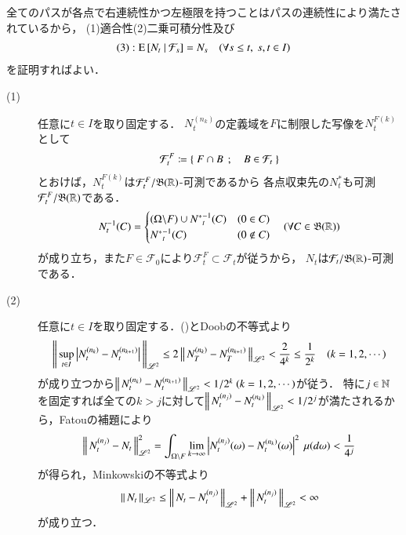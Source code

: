 \begin{prf}
		全てのパスが各点で右連続性かつ左極限を持つことはパスの連続性により満たされているから，
		(1)適合性(2)二乗可積分性及び
		\begin{align}
			\mbox{(3)}:\operatorname{E} \left[ N_t \ \middle|\ \mathcal{F}_s \right] = N_s
			\quad (\forall s \leq t,\ s,t \in I)
		\end{align}
		を証明すればよい．
		\begin{description}
			\item[(1)]
				任意に$t \in I$を取り固定する．
				$N^{(n_k)}_t$の定義域を$F$に制限した写像を$N^{F(k)}_t$として
				\begin{align}
					\mathcal{F}^F_t \coloneqq \left\{\ F \cap B\ \, ; \quad B \in \mathcal{F}_t\ \right\}
				\end{align}
				とおけば，$N^{F(k)}_t$は$\mathcal{F}^F_t/\mathfrak{B}(\mathbb{R})$-可測であるから
				各点収束先の$N^*_t$も可測$\mathcal{F}^F_t/\mathfrak{B}(\mathbb{R})$である．
				\begin{align}
					N^{-1}_t(C) = 
					\begin{cases}
						(\Omega \backslash F) \cup {N^*}^{-1}_t(C) & (0 \in C) \\
						{N^*}^{-1}_t(C) & (0 \notin C)
					\end{cases}
					\quad (\forall C \in \mathfrak{B}(\mathbb{R}))
				\end{align}
				が成り立ち，また$F \in \mathcal{F}_0$により$\mathcal{F}^F_t \subset \mathcal{F}_t$が従うから，
				$N_t$は$\mathcal{F}_t/\mathfrak{B}(\mathbb{R})$-可測である．
			
			\item[(2)]
				任意に$t \in I$を取り固定する．()とDoobの不等式より
				\begin{align}
					\left\|\, \operatorname*{sup}_{t \in I} \left|N^{(n_k)}_t - N^{(n_{k+1})}_t\right|\, \right\|_{\mathscr{L}^2} 
					\leq 2 \left\|\, N^{(n_k)}_T - N^{(n_{k+1})}_T\, \right\|_{\mathscr{L}^2} < \frac{2}{4^k} \leq \frac{1}{2^k}
					\quad (k=1,2,\cdots)
				\end{align}
				が成り立つから$\left\|\, N^{(n_k)}_t - N^{(n_{k+1})}_t\, \right\|_{\mathscr{L}^2} < 1/2^k \ (k=1,2,\cdots)$が従う．
				特に$j \in \mathbb{N}$を固定すれば全ての$k > j$に対して$\left\|\, N^{(n_j)}_t - N^{(n_k)}_t\, \right\|_{\mathscr{L}^2} < 1/2^j$が満たされるから，Fatouの補題により
				\begin{align}
					\left\|\, N^{(n_j)}_t - N_t\, \right\|_{\mathscr{L}^2}^2 = \int_{\Omega \backslash F} \lim_{k \to \infty} \left| N^{(n_j)}_t(\omega) - N^{(n_k)}_t(\omega) \right|^2\ \mu(d\omega)
					< \frac{1}{4^j}
					\label{eq:M_c2_hilbert_2}
				\end{align}
				が得られ，Minkowskiの不等式より
				\begin{align}
					\left\|\, N_t\, \right\|_{\mathscr{L}^2} \leq \left\|\, N_t - N^{(n_j)}_t\, \right\|_{\mathscr{L}^2} + \left\|\, N^{(n_j)}_t\, \right\|_{\mathscr{L}^2} < \infty
				\end{align}
				が成り立つ．
			

\end{description}
\end{prf}
